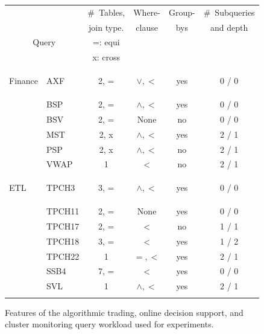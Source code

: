 \begin{figure}[t]
\scriptsize{
\begin{center}
\begin{tabular}{ p{0.15cm} | l | c | c | c  | c }
\multicolumn{2}{c|}{}      & \#~Tables,  & Where- & Group- & \#~Subqueries\\
\multicolumn{2}{c|}{}      & join type.  & clause & bys    & and depth\\
\multicolumn{2}{c|}{Query} & =: equi     &        &        & \\
\multicolumn{2}{c|}{}      & x: cross    &        &        & \\
\hline
\begin{rotate}{90}\hspace{-1.1cm}Finance\end{rotate}
& AXF        & 2, =      & $\vee, <$     & yes & 0 / 0 \\
& BSP        & 2, =      & $\wedge, <$   & yes & 0 / 0 \\
& BSV        & 2, =      & None          & no  & 0 / 0 \\
& MST        & 2, x      & $\wedge, <$   & yes & 2 / 1 \\
& PSP        & 2, x      & $\wedge, <$   & no  & 2 / 1 \\
& VWAP       & 1         & $<$           & no  & 2 / 1
\vspace{0.5mm}
\\
\hline
\begin{rotate}{90}\hspace{-0.9cm}ETL\end{rotate}
& TPCH3      & 3, =      & $\wedge, <$   & yes & 0 / 0 \\
& TPCH11     & 2, =      & None          & yes & 0 / 0 \\
& TPCH17     & 2, =      & $<$           & no  & 1 / 1 \\
& TPCH18     & 3, =      & $<$           & yes & 1 / 2 \\
& TPCH22     & 1         & $=,<$         & yes & 2 / 1 \\
& SSB4       & 7, =      & $<$           & yes & 0 / 0 \\
\hline
\comment{
& SVL        & 1         & $\wedge, <$   & yes & 2 / 1 \\
}
\end{tabular}
\end{center}
}
\vspace{-4mm}
\caption{Features of the algorithmic trading, online decision support, and
cluster monitoring query workload used for experiments.}
\label{fig:queries}
\vspace{-3mm}
\end{figure}

